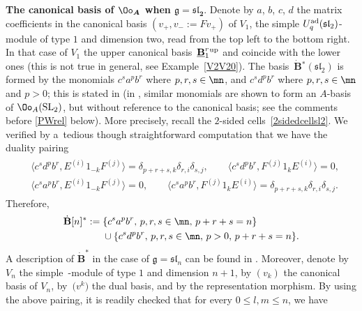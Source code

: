 {\bf The canonical basis of $\boldsymbol{\Oo_A}$ when $\boldsymbol{\mathfrak{g}={\mathfrak{sl}_2}}$}. Denote by $a$, $b$, $c$, $d$ the matrix coefficients in the canonical basis $(v_+,v_-:=Fv_+)$ of $V_1$, the simple $U_q^{\rm ad}({\mathfrak{sl}_2})$-module of type $1$ and dimension two, read from the top left to the bottom right. In that case of $V_1$ the upper canonical basis~$\underline{\mathbf{B}}_{1}^r{}^{\rm up}$ and  coincide with the lower ones (this is not true in general, see Example~\ref{V2V20}). The basis~$\dot{\mathbf{B}} {}^*({\mathfrak{sl}_2})$ is formed by the monomials $c^sa^pb^r$ where $p,r,s\in \mn$, and $c^sd^pb^r$ where $p,r,s\in \mn$ and $p>0$; this is stated in \cite[Proposition~9.1.1]{Kashiwara2} (in \cite[Proposition~1.3]{DC-L}, similar monomials are shown to form an $A$-basis of $\Oo_A({\rm SL}_2)$, but without reference to the canonical basis; see the comments before \eqref{PWrel} below). More precisely, recall the $2$-sided cells~\eqref{2sidedcellsl2}. We verified by a~tedious though straightforward computation that we have the duality pairing
\begin{gather*}
\begin{split}
& \big\langle c^sd^pb^r, E^{(i)}1_{-k}F^{(j)} \big\rangle = \delta_{p+r+s,k}\delta_{r,i}\delta_{s,j} ,\qquad \big\langle c^sd^pb^r, F^{(j)}1_{k}E^{(i)} \big\rangle =0, \\
& \big\langle c^sa^pb^r, E^{(i)}1_{-k}F^{(j)} \big\rangle = 0 ,\qquad \big\langle c^sa^pb^r, F^{(j)}1_{k}E^{(i)} \big\rangle =\delta_{p+r+s,k}\delta_{r,i}\delta_{s,j}.
\end{split}
\end{gather*}
Therefore, \begin{align*}\dot{\mathbf{B}} [n]^* :={}& \{ c^sa^pb^r, \, p,r,s\in \mn,\, p+r+s=n\} \\&\cup \{ c^{s}d^{p}b^{r},\, p,r,s\in \mn,\, p>0,\, p+r+s=n\}.\end{align*}
A description of $\dot{\mathbf{B}}^*$ in the case of $\mathfrak{g} = {\mathfrak{sl}_n}$ can be found in \cite{Du}. Moreover, denote by $V_n$ the simple~-module of type $1$ and dimension $n+1$, by $(v_k)$ the canonical basis of $V_n$, by~$\big(v^k\big)$ the dual basis, and by  the representation morphism. By using the above pairing, it is readily checked that for every $0\leq l,m\leq n$, we have
